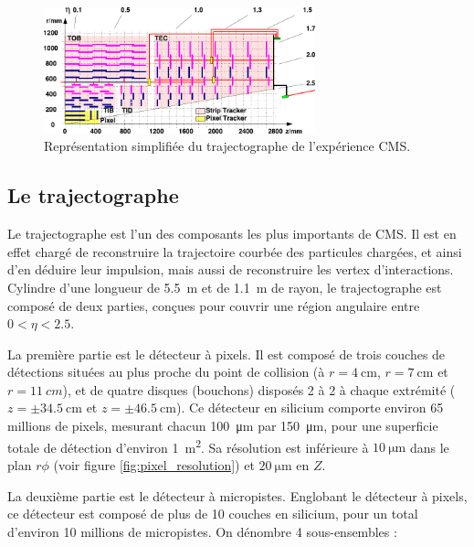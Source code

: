\begin{figure}[t] \centering
  \includegraphics[width=0.7\textwidth]{chapitre2/figs/tracker.pdf}
  \caption{Représentation simplifiée du trajectographe de l'expérience CMS.}
  \label{fig:tracker}
\end{figure}

\subsection{Le trajectographe}

Le trajectographe est l'un des composants les plus importants de CMS. Il est en effet chargé de reconstruire la trajectoire courbée des particules chargées, et ainsi d'en déduire leur impulsion, mais aussi de reconstruire les vertex d'interactions. Cylindre d'une longueur de \SI{5.5}{\m} et de \SI{1.1}{\m} de rayon, le trajectographe est composé de deux parties, conçues pour couvrir une région angulaire entre $0 < \eta < \num{2.5}$.

\smallskip

La première partie est le détecteur à pixels. Il est composé de trois couches de détections situées au plus proche du point de collision (à $r = \SI{4}{\cm}$, $r = \SI{7}{\cm}$ et $r = \SI{11}{cm}$), et de quatre disques (bouchons) disposés 2 à 2 à chaque extrémité ($z = \pm \SI{34.5}{\cm}$ et $z = \pm \SI{46.5}{\cm}$). Ce détecteur en silicium comporte environ 65 millions de pixels, mesurant chacun \SI{100}{\um} par \SI{150}{\um}, pour une superficie totale de détection d'environ \SI{1}{\square\m}. Sa résolution est inférieure à $\SI{10}{\um}$ dans le plan $r\phi$ (voir figure \ref{fig:pixel_resolution}) et $\SI{20}{\um}$ en $Z$.

La deuxième partie est le détecteur à micropistes. Englobant le détecteur à pixels, ce détecteur est composé de plus de 10 couches en silicium, pour un total d'environ 10 millions de micropistes. On dénombre 4 sous-ensembles :

